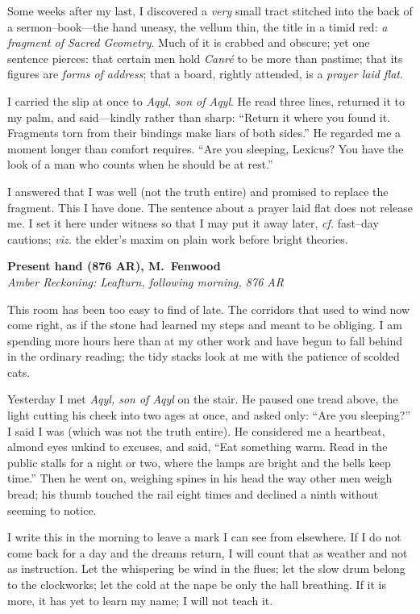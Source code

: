 \documentclass[11pt]{article}
\numberwithin{equation}{section} %
\theoremstyle{plain} %
\theoremstyle{definition} %
\theoremstyle{remark} %
\begin{document}
Some weeks after my last, I discovered a \emph{very} small tract stitched into the back of a sermon--book---the hand uneasy, the vellum thin, the title in a timid red: \textit{a fragment of Sacred Geometry}. Much of it is crabbed and obscure; yet one sentence pierces: that certain men hold \textit{Canr\'e} to be more than pastime; that its figures are \emph{forms of address}; that a board, rightly attended, is a \emph{prayer laid flat}.

I carried the slip at once to \textit{Aqyl, son of Aqyl}. He read three lines, returned it to my palm, and said---kindly rather than sharp: ``Return it where you found it. Fragments torn from their bindings make liars of both sides.'' He regarded me a moment longer than comfort requires. ``Are you sleeping, Lexicus? You have the look of a man who counts when he should be at rest.''

I answered that I was well (not the truth entire) and promised to replace the fragment. This I have done. The sentence about a prayer laid flat does not release me. I set it here under witness so that I may put it away later, \emph{cf.} fast--day cautions; \emph{viz.} the elder's maxim on plain work before bright theories.

\medskip
\noindent\textbf{Present hand (876 AR), M.\ Fenwood}\\
\noindent\textit{Amber Reckoning: Leafturn, following morning, 876 AR}

This room has been too easy to find of late. The corridors that used to wind now come right, as if the stone had learned my steps and meant to be obliging. I am spending more hours here than at my other work and have begun to fall behind in the ordinary reading; the tidy stacks look at me with the patience of scolded cats.

Yesterday I met \textit{Aqyl, son of Aqyl} on the stair. He paused one tread above, the light cutting his cheek into two ages at once, and asked only: ``Are you sleeping?'' I said I was (which was not the truth entire). He considered me a heartbeat, almond eyes unkind to excuses, and said, ``Eat something warm. Read in the public stalls for a night or two, where the lamps are bright and the bells keep time.'' Then he went on, weighing spines in his head the way other men weigh bread; his thumb touched the rail eight times and declined a ninth without seeming to notice.

I write this in the morning to leave a mark I can see from elsewhere. If I do not come back for a day and the dreams return, I will count that as weather and not as instruction. Let the whispering be wind in the flues; let the slow drum belong to the clockworks; let the cold at the nape be only the hall breathing. If it is more, it has yet to learn my name; I will not teach it.
\end{document}
